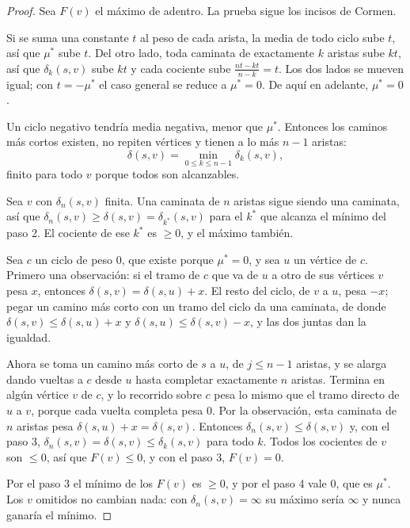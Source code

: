 \documentclass[11pt,letterpaper]{article}
\begin{document}
\begin{proof}
  Sea $F(v)$ el máximo de adentro. La prueba sigue los incisos de
  Cormen.

   Si se suma una constante
  $t$ al peso de cada arista, la media de todo ciclo sube $t$, así que
  $\mu^*$ sube $t$. Del otro lado, toda caminata de exactamente $k$
  aristas sube $kt$, así que $\delta_k(s, v)$ sube $kt$ y cada cociente
  sube $\frac{nt - kt}{n - k} = t$. Los dos lados se mueven igual; con
  $t = -\mu^*$ el caso general se reduce a $\mu^* = 0$. De aquí en
  adelante, $\mu^* = 0$.

   Un ciclo negativo tendría
  media negativa, menor que $\mu^*$. Entonces los caminos más cortos
  existen, no repiten vértices y tienen a lo más $n - 1$ aristas:
  \[
    \delta(s, v) = \min_{0 \le k \le n - 1} \delta_k(s, v) ,
  \]
  finito para todo $v$ porque todos son alcanzables.

   Sea $v$ con $\delta_n(s, v)$ finita. Una
  caminata de $n$ aristas sigue siendo una caminata, así que
  $\delta_n(s, v) \ge \delta(s, v) = \delta_{k^*}(s, v)$ para el $k^*$
  que alcanza el mínimo del paso 2. El cociente de ese $k^*$ es
  $\ge 0$, y el máximo también.

   Sea $c$ un ciclo de peso
  $0$, que existe porque $\mu^* = 0$, y sea $u$ un vértice de $c$.
  Primero una observación: si el tramo de $c$ que va de $u$ a otro de
  sus vértices $v$ pesa $x$, entonces $\delta(s, v) = \delta(s, u) + x$.
  El resto del ciclo, de $v$ a $u$, pesa $-x$; pegar un camino más
  corto con un tramo del ciclo da una caminata, de donde
  $\delta(s, v) \le \delta(s, u) + x$ y
  $\delta(s, u) \le \delta(s, v) - x$, y las dos juntas dan la
  igualdad.

  Ahora se toma un camino más corto de $s$ a $u$, de $j \le n - 1$
  aristas, y se alarga dando vueltas a $c$ desde $u$ hasta completar
  exactamente $n$ aristas. Termina en algún vértice $v$ de $c$, y lo
  recorrido sobre $c$ pesa lo mismo que el tramo directo de $u$ a $v$,
  porque cada vuelta completa pesa $0$. Por la observación, esta
  caminata de $n$ aristas pesa $\delta(s, u) + x = \delta(s, v)$.
  Entonces $\delta_n(s, v) \le \delta(s, v)$ y, con el paso 3,
  $\delta_n(s, v) = \delta(s, v) \le \delta_k(s, v)$ para todo $k$.
  Todos los cocientes de $v$ son $\le 0$, así que $F(v) \le 0$, y con
  el paso 3, $F(v) = 0$.

   Por el paso 3 el mínimo de los $F(v)$ es $\ge 0$, y
  por el paso 4 vale $0$, que es $\mu^*$. Los $v$ omitidos no cambian
  nada: con $\delta_n(s, v) = \infty$ su máximo sería $\infty$ y nunca
  ganaría el mínimo.
\end{proof}
\end{document}
